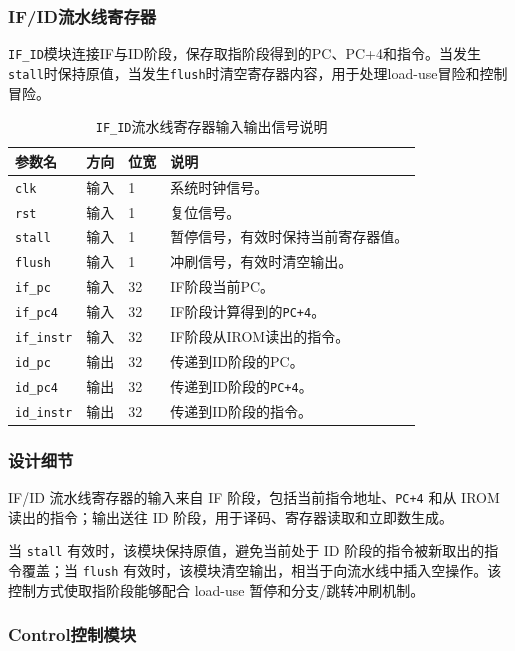 \documentclass[UTF8,a4paper,12pt]{ctexart}
\newcommand{\code}[1]{\texttt{#1}}
\begin{document}
\subsubsection{IF/ID流水线寄存器}

\code{IF\_ID}模块连接IF与ID阶段，保存取指阶段得到的PC、PC+4和指令。当发生\code{stall}时保持原值，当发生\code{flush}时清空寄存器内容，用于处理load-use冒险和控制冒险。

\begin{table}[H]
\centering
\caption{\code{IF\_ID}流水线寄存器输入输出信号说明}
\footnotesize
\renewcommand{\arraystretch}{1.15}
\begin{tabularx}{\textwidth}{p{3.2cm}p{1.5cm}p{2.1cm}X}
\toprule
参数名 & 方向 & 位宽 & 说明 \\
\midrule
\code{clk} & 输入 & 1 & 系统时钟信号。 \\
\code{rst} & 输入 & 1 & 复位信号。 \\
\code{stall} & 输入 & 1 & 暂停信号，有效时保持当前寄存器值。 \\
\code{flush} & 输入 & 1 & 冲刷信号，有效时清空输出。 \\
\code{if\_pc} & 输入 & 32 & IF阶段当前PC。 \\
\code{if\_pc4} & 输入 & 32 & IF阶段计算得到的\code{PC+4}。 \\
\code{if\_instr} & 输入 & 32 & IF阶段从IROM读出的指令。 \\
\code{id\_pc} & 输出 & 32 & 传递到ID阶段的PC。 \\
\code{id\_pc4} & 输出 & 32 & 传递到ID阶段的\code{PC+4}。 \\
\code{id\_instr} & 输出 & 32 & 传递到ID阶段的指令。 \\
\bottomrule
\end{tabularx}
\end{table}

\subsubsection*{设计细节}

IF/ID 流水线寄存器的输入来自 IF 阶段，包括当前指令地址、\code{PC+4} 和从 IROM 读出的指令；输出送往 ID 阶段，用于译码、寄存器读取和立即数生成。

当 \code{stall} 有效时，该模块保持原值，避免当前处于 ID 阶段的指令被新取出的指令覆盖；当 \code{flush} 有效时，该模块清空输出，相当于向流水线中插入空操作。该控制方式使取指阶段能够配合 load-use 暂停和分支/跳转冲刷机制。

\subsubsection{Control控制模块}
\end{document}

